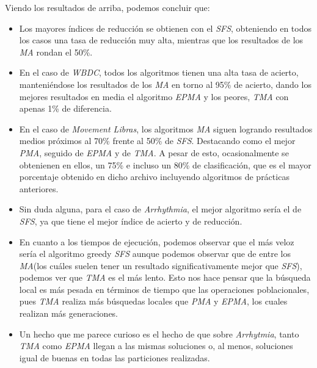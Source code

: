 \documentclass[a4paper, 11pt]{article}
\begin{document}
			Viendo los resultados de arriba, podemos concluir que:
			\begin{itemize}
				\item Los mayores índices de reducción se obtienen con el \textit{SFS}, obteniendo en
				todos los casos una tasa de reducción muy alta, mientras que los resultados de los
				\textit{MA} rondan el 50\%.
				
				\item En el caso de \textit{WBDC}, todos los algoritmos tienen una alta tasa de acierto,
				manteniéndose los resultados de los \textit{MA} en torno al 95\% de acierto, dando los
				mejores resultados en media el algoritmo \textit{EPMA} y los peores, \textit{TMA} con
				apenas 1\% de diferencia.
				
				\item En el caso de \textit{Movement Libras}, los algoritmos \textit{MA} siguen logrando
				resultados medios próximos al 70\% frente al 50\% de \textit{SFS}. Destacando como el
				mejor \textit{PMA}, seguido de \textit{EPMA} y de \textit{TMA}. A pesar de esto,
				ocasionalmente se obtenienen en ellos, un 75\% e incluso un 80\% de clasificación, que
				es el mayor porcentaje obtenido en dicho archivo incluyendo algoritmos de prácticas
				anteriores.
				
				\item Sin duda alguna, para el caso de \textit{Arrhythmia}, el mejor algoritmo sería
				el de \textit{SFS}, ya que tiene el mejor índice de acierto y de reducción.
				
				\item En cuanto a los tiempos de ejecución, podemos observar que el más veloz sería el
				algoritmo greedy \textit{SFS} aunque podemos observar que de entre los \textit{MA}(los
				cuáles suelen tener un resultado significativamente mejor que \textit{SFS}), podemos
				ver que \textit{TMA} es el más lento. Esto nos hace pensar que la búsqueda local es
				más pesada en términos de tiempo que las operaciones poblacionales, pues \textit{TMA}
				realiza más búsquedas locales que \textit{PMA} y \textit{EPMA}, los cuales realizan
				más generaciones.
				
				\item Un hecho que me parece curioso es el hecho de que sobre \textit{Arrhytmia}, tanto
				\textit{TMA} como \textit{EPMA} llegan a las mismas soluciones o, al menos, soluciones
				igual de buenas en todas las particiones realizadas.
			\end{itemize}
			
\end{document}
